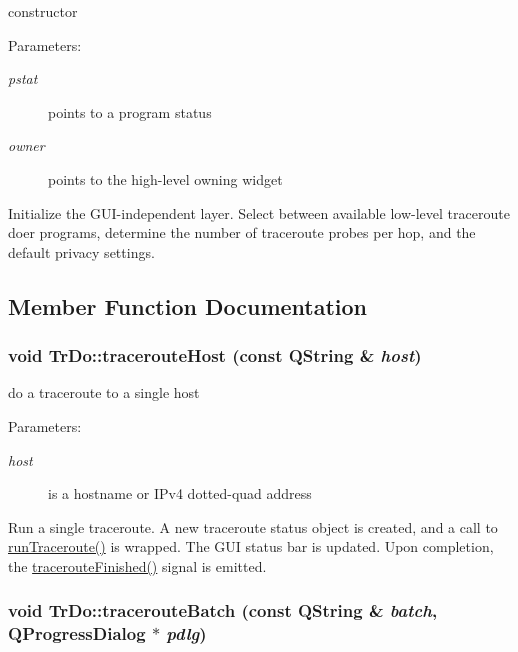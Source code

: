constructor \begin{Desc}
\item[Parameters:]
\begin{description}
\item[{\em pstat}]points to a program status \item[{\em owner}]points to the high-level owning widget\end{description}
\end{Desc}
Initialize the GUI-independent layer. Select between available low-level traceroute doer programs, determine the number of traceroute probes per hop, and the default privacy settings. 

\subsection{Member Function Documentation}
\hypertarget{classTrDo_13b09aaa50b54aa250c327007232ef35}{
\subsubsection[tracerouteHost]{\setlength{\rightskip}{0pt plus 5cm}void TrDo::tracerouteHost (const QString \& {\em host})}}
\label{classTrDo_13b09aaa50b54aa250c327007232ef35}


do a traceroute to a single host \begin{Desc}
\item[Parameters:]
\begin{description}
\item[{\em host}]is a hostname or IPv4 dotted-quad address\end{description}
\end{Desc}
Run a single traceroute. A new traceroute status object is created, and a call to \hyperlink{classTrDo_04829a8efd9827ec069150bb3a9880ff}{runTraceroute()} is wrapped. The GUI status bar is updated. Upon completion, the \hyperlink{classTrDo_22fbf5ee2a4bf2df9b6bf1d3ddfa8f67}{tracerouteFinished()} signal is emitted. \hypertarget{classTrDo_60f80f4c9d937ab0572d18f1a4e7d4f3}{
\subsubsection[tracerouteBatch]{\setlength{\rightskip}{0pt plus 5cm}void TrDo::tracerouteBatch (const QString \& {\em batch}, \/  QProgressDialog $\ast$ {\em pdlg})}}
\label{classTrDo_60f80f4c9d937ab0572d18f1a4e7d4f3}


